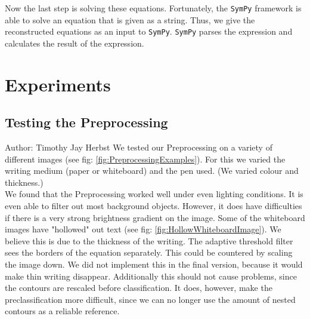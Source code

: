 \documentclass[12pt]{article}
\begin{document}
	Now the last step is solving these equations. Fortunately, the \texttt{SymPy} framework is able to solve an equation that is given as a string. Thus, we give the reconstructed equations as an input to \texttt{SymPy}. \texttt{SymPy} parses the expression and calculates the result of the expression.
	
	
	\section{Experiments}
	
	\subsection{Testing the Preprocessing}
	
	\small{Author: Timothy Jay Herbst} \newline \newline
	We tested our Preprocessing on a variety of different images (see fig: \ref{fig:PreprocessingExamples}).
	For this we varied the writing medium (paper or whiteboard) and the pen used.
	(We varied colour and thickness.)\\
	We found that the Preprocessing worked well under even lighting conditions.
	It is even able to filter out most background objects.
	However, it does have difficulties if there is a very strong brightness gradient on the image.
	Some of the whiteboard images have "hollowed" out text (see fig: \ref{fig:HollowWhiteboardImage}).
	We believe this is due to the thickness of the writing.
	The adaptive threshold filter sees the borders of the equation separately.
	This could be countered by scaling the image down.
	We did not implement this in the final version, because it would make thin writing disappear.
	Additionally this should not cause problems, since the contours are rescaled before classification.
	It does, however, make the preclassification more difficult, since we can no longer use the amount of nested contours as a reliable reference.
\end{document}
